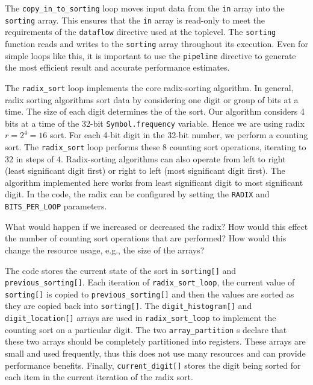The \lstinline{copy_in_to_sorting} loop moves input data from the \lstinline{in} array into the \lstinline{sorting} array.  This ensures that the \lstinline{in} array is read-only to meet the requirements of the \lstinline{dataflow} directive used at the toplevel. The \lstinline{sorting} function reads and writes to the \lstinline{sorting} array throughout its execution. Even for simple loops like this, it is important to use the \lstinline{pipeline} directive to generate the most efficient result and accurate performance estimates.

The \lstinline{radix_sort} loop implements the core radix-sorting algorithm.   In general, radix sorting algorithms sort data by considering one digit or group of bits at a time.  The size of each digit determines the  of the sort.  Our algorithm considers 4 bits at a time of the 32-bit \lstinline{Symbol.frequency} variable.  Hence we are using radix $r=2^{4}=16$ sort.  For each 4-bit digit in the 32-bit number, we perform a counting sort. The \lstinline{radix_sort} loop performs these 8 counting sort operations, iterating to $32$ in steps of $4$.   Radix-sorting algorithms can also operate from left to right (least significant digit first) or right to left (most significant digit first).   The algorithm implemented here works from least significant digit to most significant digit.   In the code, the radix can be configured by setting the \lstinline{RADIX} and \lstinline{BITS_PER_LOOP} parameters. 

\begin{exercise}
What would happen if we increased or decreased the radix? How would this effect the number of counting sort operations that are performed? How would this change the resource usage, e.g., the size of the arrays?
\end{exercise}

The code stores the current state of the sort in \lstinline{sorting[]} and \lstinline{previous_sorting[]}.  Each iteration of \lstinline{radix_sort_loop}, the current value of \lstinline{sorting[]} is copied to \lstinline{previous_sorting[]} and then the values are sorted as they are copied back into \lstinline{sorting[]}.  The \lstinline{digit_histogram[]} and \lstinline{digit_location[]} arrays are used in \lstinline{radix_sort_loop} to implement the counting sort on a particular digit. The two \lstinline{array_partition} s declare that these two arrays should be completely partitioned into registers. These arrays are small and used frequently, thus this does not use many resources and can provide performance benefits. Finally, \lstinline{current_digit[]} stores the digit being sorted for each item in the current iteration of the radix sort.

